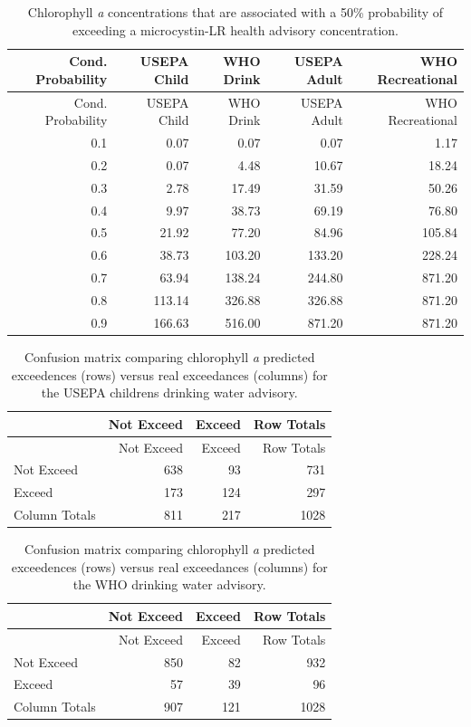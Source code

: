\documentclass[10pt,a4paper,twocolumn]{article}
\begin{document}
\newpage

\begin{longtable}[c]{@{}rrrrr@{}}
\caption{Chlorophyll \textit{a} concentrations that are associated with
a 50\% probability of exceeding a microcystin-LR health advisory
concentration. \label{tab:mc_chla_table}}\tabularnewline
\toprule
Cond. Probability & USEPA Child & WHO Drink & USEPA Adult & WHO
Recreational\tabularnewline
\midrule
\endfirsthead
\toprule
Cond. Probability & USEPA Child & WHO Drink & USEPA Adult & WHO
Recreational\tabularnewline
\midrule
\endhead
0.1 & 0.07 & 0.07 & 0.07 & 1.17\tabularnewline
0.2 & 0.07 & 4.48 & 10.67 & 18.24\tabularnewline
0.3 & 2.78 & 17.49 & 31.59 & 50.26\tabularnewline
0.4 & 9.97 & 38.73 & 69.19 & 76.80\tabularnewline
0.5 & 21.92 & 77.20 & 84.96 & 105.84\tabularnewline
0.6 & 38.73 & 103.20 & 133.20 & 228.24\tabularnewline
0.7 & 63.94 & 138.24 & 244.80 & 871.20\tabularnewline
0.8 & 113.14 & 326.88 & 326.88 & 871.20\tabularnewline
0.9 & 166.63 & 516.00 & 871.20 & 871.20\tabularnewline
\bottomrule
\end{longtable}

\newpage

\begin{longtable}[c]{@{}lrrr@{}}
\caption{Confusion matrix comparing chlorophyll \textit{a} predicted
exceedences (rows) versus real exceedances (columns) for the USEPA
childrens drinking water advisory.
\label{tab:child_conmat_table}}\tabularnewline
\toprule
& Not Exceed & Exceed & Row Totals\tabularnewline
\midrule
\endfirsthead
\toprule
& Not Exceed & Exceed & Row Totals\tabularnewline
\midrule
\endhead
Not Exceed & 638 & 93 & 731\tabularnewline
Exceed & 173 & 124 & 297\tabularnewline
Column Totals & 811 & 217 & 1028\tabularnewline
\bottomrule
\end{longtable}

\newpage

\begin{longtable}[c]{@{}lrrr@{}}
\caption{Confusion matrix comparing chlorophyll \textit{a} predicted
exceedences (rows) versus real exceedances (columns) for the WHO
drinking water advisory.
\label{tab:who_drink_conmat_table}}\tabularnewline
\toprule
& Not Exceed & Exceed & Row Totals\tabularnewline
\midrule
\endfirsthead
\toprule
& Not Exceed & Exceed & Row Totals\tabularnewline
\midrule
\endhead
Not Exceed & 850 & 82 & 932\tabularnewline
Exceed & 57 & 39 & 96\tabularnewline
Column Totals & 907 & 121 & 1028\tabularnewline
\bottomrule
\end{longtable}
\end{document}
